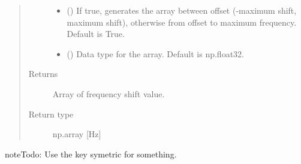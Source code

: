 \documentclass[a4paper,10pt,english]{sphinxmanual}
\begin{document}
\begin{fulllineitems}
\begin{quote}
\begin{description}
\begin{itemize}
\item {} 
 () \textendash{} If true, generates the array between offset (-maximum shift,
maximum shift), otherwise from offset to maximum frequency. Default is True.

\item {} 
 () \textendash{} Data type for the array. Default is np.float32.

\end{itemize}

\item[{Returns}] \leavevmode
Array of frequency shift value.

\item[{Return type}] \leavevmode
np.array {[}Hz{]}

\end{description}\end{quote}

\begin{sphinxadmonition}{note}{\label{autodoc/mrsprint/mrsprint.simulator:index-3}Todo:}
Use the key symetric for something.
\end{sphinxadmonition}

\end{fulllineitems}

\end{document}
